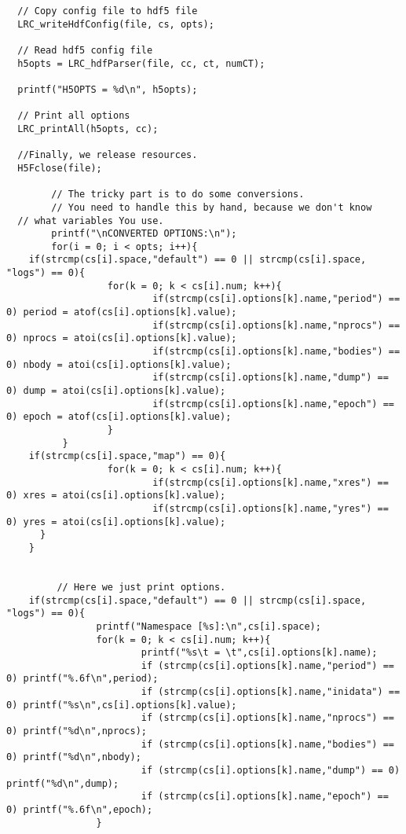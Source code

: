 \begin{DocInclude}
\begin{verbatim}
  // Copy config file to hdf5 file
  LRC_writeHdfConfig(file, cs, opts);

  // Read hdf5 config file
  h5opts = LRC_hdfParser(file, cc, ct, numCT);

  printf("H5OPTS = %d\n", h5opts);
  
  // Print all options
  LRC_printAll(h5opts, cc);
 
  //Finally, we release resources.
  H5Fclose(file);
        
        // The tricky part is to do some conversions.
        // You need to handle this by hand, because we don't know
  // what variables You use. 
        printf("\nCONVERTED OPTIONS:\n");
        for(i = 0; i < opts; i++){
    if(strcmp(cs[i].space,"default") == 0 || strcmp(cs[i].space, "logs") == 0){
                  for(k = 0; k < cs[i].num; k++){
                          if(strcmp(cs[i].options[k].name,"period") == 0) period = atof(cs[i].options[k].value);  
                          if(strcmp(cs[i].options[k].name,"nprocs") == 0) nprocs = atoi(cs[i].options[k].value); 
                          if(strcmp(cs[i].options[k].name,"bodies") == 0) nbody = atoi(cs[i].options[k].value); 
                          if(strcmp(cs[i].options[k].name,"dump") == 0) dump = atoi(cs[i].options[k].value); 
                          if(strcmp(cs[i].options[k].name,"epoch") == 0) epoch = atof(cs[i].options[k].value); 
                  }
          }
    if(strcmp(cs[i].space,"map") == 0){
                  for(k = 0; k < cs[i].num; k++){
                          if(strcmp(cs[i].options[k].name,"xres") == 0) xres = atoi(cs[i].options[k].value);  
                          if(strcmp(cs[i].options[k].name,"yres") == 0) yres = atoi(cs[i].options[k].value); 
      }
    }


         // Here we just print options.
    if(strcmp(cs[i].space,"default") == 0 || strcmp(cs[i].space, "logs") == 0){
                printf("Namespace [%s]:\n",cs[i].space);
                for(k = 0; k < cs[i].num; k++){
                        printf("%s\t = \t",cs[i].options[k].name);
                        if (strcmp(cs[i].options[k].name,"period") == 0) printf("%.6f\n",period);
                        if (strcmp(cs[i].options[k].name,"inidata") == 0) printf("%s\n",cs[i].options[k].value);
                        if (strcmp(cs[i].options[k].name,"nprocs") == 0) printf("%d\n",nprocs);
                        if (strcmp(cs[i].options[k].name,"bodies") == 0) printf("%d\n",nbody);
                        if (strcmp(cs[i].options[k].name,"dump") == 0) printf("%d\n",dump);
                        if (strcmp(cs[i].options[k].name,"epoch") == 0) printf("%.6f\n",epoch);
                }
    

\end{verbatim}
\end{DocInclude}
